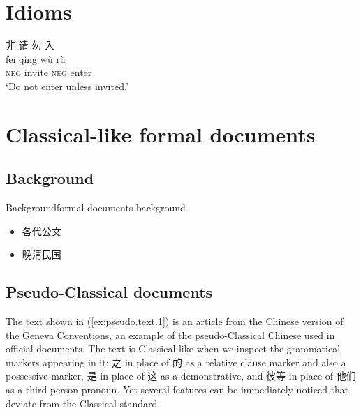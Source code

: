\documentclass[UTF8, a4paper, oneside, scheme=plain, 12pt]{ctexrep}
\newcommand{\translate}[1]{`#1'}
\newcommand*{\category}[1]{\textsc{#1}}
\begin{document}
\section{Idioms}

\begin{exe}
    \ex
    \glll 非 请 勿 入 \\
    fēi qǐng wù rù \\
    \category{neg} invite \category{neg} enter \\
    \glt\translate{Do not enter unless invited.}
\end{exe}

\section{Classical-like formal documents}

\subsection{Background}

\begin{todobox}{Background}{formal-documents-background}
    \begin{itemize}
        \item 各代公文
        \item 晚清民国
    \end{itemize}
\end{todobox}

\subsection{Pseudo-Classical documents}\label{sec:genres.pseudo}

The text shown in (\ref{ex:pseudo.text.1}) is an article from the Chinese version of the Geneva Conventions, an example of the pseudo-Classical Chinese used in official documents.
The text is Classical-like when we inspect the grammatical markers appearing in it:
之 in place of 的 as a relative clause marker and also a possessive marker,
是 in place of 这 as a demonstrative,
and 彼等 in place of 他们 as a third person pronoun.
Yet several features can be immediately noticed that deviate from the Classical standard.
\end{document}
